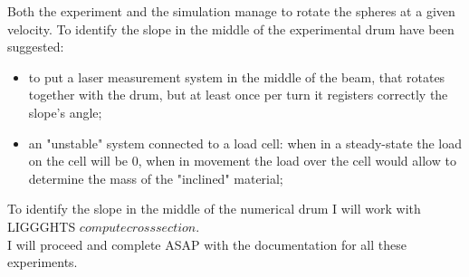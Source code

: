 Both the experiment and the simulation manage to rotate the spheres at a given velocity.
To identify the slope in the middle of the experimental drum have been suggested:
\begin{itemize}
\item{to put a laser measurement system in the middle of the beam, that rotates together with the drum, but at least once per turn it registers correctly the slope's angle;}
\item{an "unstable" system connected to a load cell: when in a steady-state the load on the cell will be $0$, when in movement the load over the cell would allow to determine the mass of the "inclined" material;}
\end{itemize}
To identify the slope in the middle of the numerical drum I will work with LIGGGHTS $compute crosssection$.\\

I will proceed and complete ASAP with the documentation for all these experiments.\\
